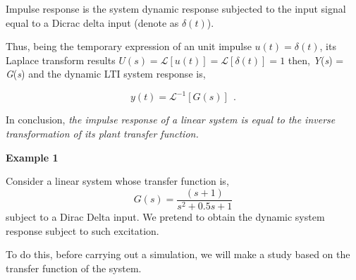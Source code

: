 Impulse response  is the system dynamic response subjected to the input signal equal to a Dicrac delta input (denote as $\delta(t)$).

Thus, being the temporary expression of an unit impulse $u(t) = \delta(t)$, its Laplace transform results $U(s) = \mathscr{L}[u(t)] = \mathscr{L}[\delta(t)] = 1$ then,  \textit{Y}(\textit{s}) = \textit{G}(\textit{s}) and the dynamic LTI system response is,

\begin{equation} \label{Eq06_chp_trans}
y(t) = \mathscr{L}^{-1}[G(s)] ~~\mbox{.}
\end{equation}

In conclusion, \textit{the impulse response of a linear system is equal to the inverse transformation of its plant transfer function.}

\vspace{0.4cm}
\textbf{Example 1} \label{ejem01_gla_oct}

	Consider a linear system whose transfer function is,
	\begin{equation}\label{eqn_Gs_ejem01}
		G(s)=\frac{(s+1)}{s^2+ 0.5 s +1}
	\end{equation}
	subject to a Dirac Delta input. We pretend to obtain the dynamic system response  subject to such excitation.
	
	\vspace{0.4cm}
	To do this, before carrying out a simulation, we will make a study based on the transfer function of the system.
	
